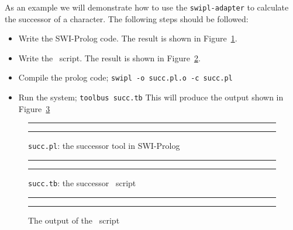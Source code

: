 As an example we will demonstrate how to use the {\tt swipl-adapter} to
calculate the successor of a character. The following steps should be
followed:

\begin{itemize}
\item Write the SWI-Prolog code. The result is shown in
Figure~\ref{fig:succ.pl}.
\item Write the \T\ script. The result is shown in
Figure~\ref{fig:succ.tb}.
\item Compile the prolog code; {\tt swipl -o succ.pl.o -c succ.pl}
\item Run the system; {\tt toolbus succ.tb}
This will produce the output shown in
Figure~\ref{fig:succ.output}
\end{itemize}

\begin{figure}
\rule{\textwidth}{0.5mm}

	\caption{{\tt succ.pl}: the successor tool in SWI-Prolog}
	\label{fig:succ.pl}
\rule{\textwidth}{0.5mm}
\end{figure}

\begin{figure}
\rule{\textwidth}{0.5mm}

	\caption{{\tt succ.tb}: the successor \T\ script}
	\label{fig:succ.tb}
\rule{\textwidth}{0.5mm}
\end{figure}

\begin{figure}
\rule{\textwidth}{0.5mm}

	\caption{The output of the \T\ script}
	\label{fig:succ.output}
\rule{\textwidth}{0.5mm}
\end{figure}

